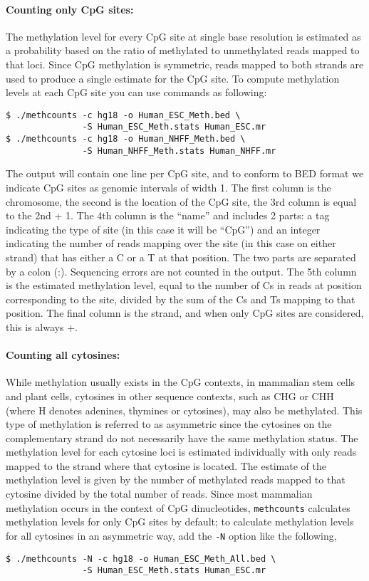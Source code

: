 \documentclass[10pt]{article}
\newcommand{\prog}[1]{\texttt{#1}}
\newcommand{\op}[1]{\texttt{#1}}
\begin{document}
\paragraph{Counting only CpG sites:}
The methylation level for every CpG site at single base resolution is
estimated as a probability based on the ratio of methylated to
unmethylated reads mapped to that loci. Since CpG methylation is
symmetric, reads mapped to both strands are used to produce a single
estimate for the CpG site. To compute methylation levels at each CpG
site you can use commands as following:
\begin{verbatim}
$ ./methcounts -c hg18 -o Human_ESC_Meth.bed \
               -S Human_ESC_Meth.stats Human_ESC.mr
$ ./methcounts -c hg18 -o Human_NHFF_Meth.bed \
               -S Human_NHFF_Meth.stats Human_NHFF.mr
\end{verbatim}
The output will contain one line per CpG site, and to conform to BED
format we indicate CpG sites as genomic intervals of width 1. The
first column is the chromosome, the second is the location of the CpG
site, the 3rd column is equal to the 2nd + 1. The 4th column is the
``name'' and includes 2 parts: a tag indicating the type of site (in
this case it will be ``CpG'') and an integer indicating the number of
reads mapping over the site (in this case on either strand) that has
either a C or a T at that position. The two parts are separated by a
colon (:). Sequencing errors are not counted in the output. The 5th
column is the estimated methylation level, equal to the number of Cs
in reads at position corresponding to the site, divided by the sum of
the Cs and Ts mapping to that position. The final column is the
strand, and when only CpG sites are considered, this is always +.

\paragraph{Counting all cytosines:}
While methylation usually exists in the CpG contexts, in mammalian
stem cells and plant cells, cytosines in other sequence contexts, such
as CHG or CHH (where H denotes adenines, thymines or cytosines), may
also be methylated. This type of methylation is referred to as
asymmetric since the cytosines on the complementary strand do not
necessarily have the same methylation status. The methylation level
for each cytosine loci is estimated individually with only reads
mapped to the strand where that cytosine is located. The estimate of
the methylation level is given by the number of methylated reads
mapped to that cytosine divided by the total number of reads. Since
most mammalian methylation occurs in the context of CpG dinucleotides,
\prog{methcounts} calculates methylation levels for only CpG sites by
default; to calculate methylation levels for all cytosines in an
asymmetric way, add the \op{-N} option like the following,
\begin{verbatim}
$ ./methcounts -N -c hg18 -o Human_ESC_Meth_All.bed \
               -S Human_ESC_Meth.stats Human_ESC.mr
\end{verbatim}
\end{document}
